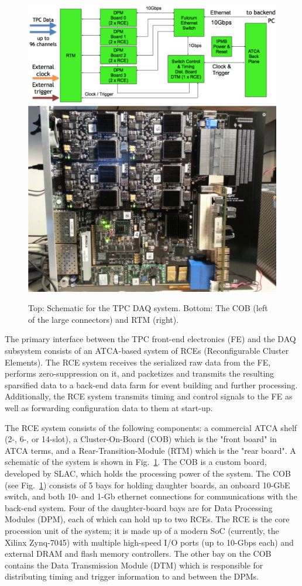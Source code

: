 \begin{figure}[htb]
\centering
\begin{minipage}[b]{1.0\textwidth}
\begin{center}
\includegraphics[width=1.0\textwidth]{figures/rce-block.pdf}
\includegraphics[width=.5\textwidth]{figures/COB-gen3.pdf}
\end{center}
\end{minipage}
\caption{Top: Schematic for the TPC DAQ system. Bottom: The COB (left of the large connectors) and RTM (right).}
\label{fig:rce}
\end{figure}

The primary interface between the TPC front-end electronics (FE) and the DAQ subsystem consists of an ATCA-based system of
RCEs (Reconfigurable Cluster Elements).
The RCE system receives the serialized raw data from the FE, performs zero-suppression on it,
and packetizes and transmits the resulting sparsified data to a back-end data farm for event building and further processing.
Additionally, the RCE system transmits timing and control signals to the FE as well as forwarding configuration data
to them at start-up.     

The RCE system consists of the following components:
a commercial ATCA shelf (2-, 6-, or 14-slot), a Cluster-On-Board (COB) which is the "front board" in ATCA terms,
and a Rear-Transition-Module (RTM) which is the "rear board".
A schematic of the system is shown in Fig.~\ref{fig:rce}.
The COB is a custom board, developed by SLAC, which holds the processing power of the system.
The COB (see Fig.~\ref{fig:rce}) consists of 5 bays for holding daughter boards, an onboard 10-GbE switch,
and both 10- and 1-Gb ethernet connections for communications with the back-end system.
Four of the daughter-board bays are for Data Processing Modules (DPM), each of which can hold up to two RCEs.
The RCE is the core procession unit of the system; it is made up of a modern SoC (currently, the Xilinx Zynq-7045)
with multiple high-speed I/O ports (up to 10-Gbps each) and external DRAM and flash memory controllers.
The other bay on the COB contains the Data Transmission Module (DTM) which is responsible
for distributing timing and trigger information to and between the DPMs.  

